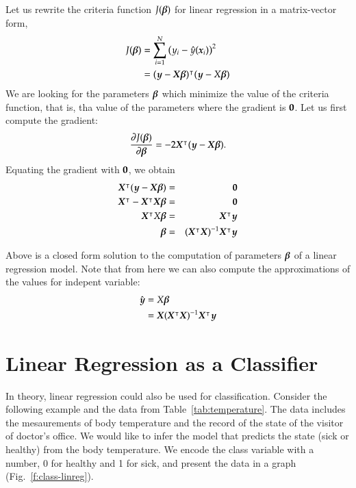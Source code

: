 \begin{refsection}
Let us rewrite the criteria function $J(\boldsymbol{\beta})$ for linear regression in a matrix-vector form,
\begin{align}
J(\boldsymbol{\beta}) & = \sum_{i=1}^N\left(y_i-\hat{y}(\boldsymbol{x}_i)\right)^2 \\
& = (\boldsymbol{y}-\boldsymbol{X}\boldsymbol{\beta})^\intercal (\boldsymbol{y}-X\boldsymbol{\beta})
\end{align}
We are looking for the parameters $\boldsymbol{\beta}$ which minimize the value of the criteria function, that is, tha value of the parameters where the gradient is $\boldsymbol{0}$. Let us first compute the gradient:
\begin{equation}
{\partial J(\boldsymbol{\beta}) \over\partial\boldsymbol{\beta}} = -2 \boldsymbol{X}^\intercal(\boldsymbol{y}-\boldsymbol{X}\boldsymbol{\beta}).
\end{equation}
Equating the gradient with $\boldsymbol{0}$, we obtain
\begin{eqnarray}
\boldsymbol{X}^\intercal(\boldsymbol{y}-\boldsymbol{X}\boldsymbol{\beta}) & = & \boldsymbol{0} \\
\boldsymbol{X}^\intercal-\boldsymbol{X}^\intercal\boldsymbol{X}\boldsymbol{\beta} & = & \boldsymbol{0} \\
\boldsymbol{X}^\intercal X\boldsymbol{\beta} & = & \boldsymbol{X}^\intercal \boldsymbol{y} \\
\boldsymbol{\beta} & = & (\boldsymbol{X}^\intercal \boldsymbol{X})^{-1}\boldsymbol{X}^\intercal \boldsymbol{y}
\end{eqnarray}

Above is a closed form solution to the computation of parameters $\boldsymbol{\beta}$ of a linear regression model. Note that from here we can also compute the approximations of the values for  indepent variable:
\begin{align}
\hat{\boldsymbol{y}} & = X\boldsymbol{\beta} \\
& = \boldsymbol{X} (\boldsymbol{X}^\intercal \boldsymbol{X})^{-1}\boldsymbol{X}^\intercal \boldsymbol{y}
\end{align}

\section{Linear Regression as a Classifier}

In theory, linear regression could also be used for classification. Consider the following example and the data from Table~\ref{tab:temperature}. The data includes the mesaurements of body temperature and the record of the state of the visitor of doctor's office. We would like to infer the model that predicts the state (sick or healthy) from the body temperature. We encode the class variable with a number, 0 for healthy and 1 for sick, and present the data in a graph (Fig.~\ref{f:class-linreg}).


\end{refsection}
